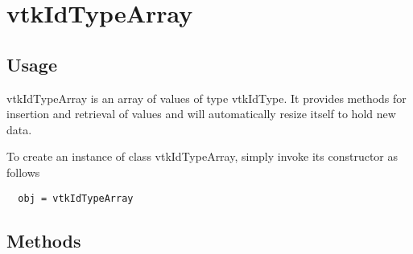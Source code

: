 \section{vtkIdTypeArray}

\subsection{Usage}

 vtkIdTypeArray is an array of values of type vtkIdType.
 It provides methods for insertion and retrieval of values and will
 automatically resize itself to hold new data.

To create an instance of class vtkIdTypeArray, simply
invoke its constructor as follows
\begin{verbatim}
  obj = vtkIdTypeArray
\end{verbatim}
\subsection{Methods}

